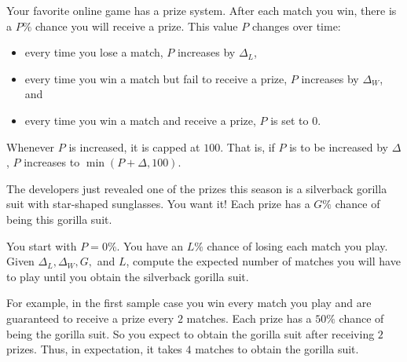 
Your favorite online game has a prize system. After each match you win,
there is a $P\%$ chance you will receive a prize. This value $P$ changes
over time:
\begin{itemize}
  \item every time you lose a match, $P$ increases by $\Delta_L$,
  \item every time you win a match but fail to receive a prize, $P$
  increases by $\Delta_W$, and
  \item every time you win a match and receive a prize, $P$ is set to $0$.
\end{itemize}
Whenever $P$ is increased, it is capped at $100$. That is, if $P$ is to be
increased by $\Delta$, $P$ increases to $\min(P+\Delta, 100)$.

The developers just revealed one of the prizes this season is a silverback
gorilla suit with star-shaped sunglasses. You want it! Each prize has a $G\%$
chance of being this gorilla suit.

You start with $P = 0\%$. You have an $L\%$ chance of losing each match you
play. Given $\Delta_L, \Delta_W, G,$ and $L$, compute the expected number of
matches you will have to play until you obtain the silverback gorilla suit.

For example, in the first sample case you win every match you play and are
guaranteed to receive a prize every $2$ matches. Each prize has a $50\%$ chance
of being the gorilla suit. So you expect to obtain the gorilla suit after
receiving $2$ prizes. Thus, in expectation, it takes $4$ matches to obtain the
gorilla suit.

%

